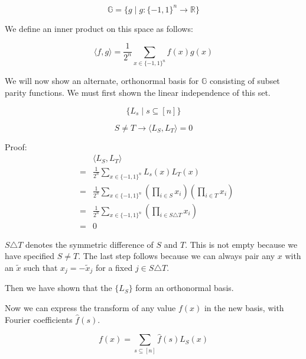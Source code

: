 \documentclass[12pt]{article}
\begin{document}
\begin{displaymath}
\mathbb{G} = \{g \mid g: \{-1,1\}^n \rightarrow \mathbb{R}\}
\end{displaymath}

We define an inner product on this space as follows:

\begin{displaymath}
\langle f,g \rangle = \frac{1}{2^n} \sum_{x \in \{-1,1\}^n} f(x)g(x)
\end{displaymath}

We will now show an alternate, orthonormal basis for $\mathbb{G}$
consisting of subset parity functions.
We must first shown
the linear independence of this set.

\begin{displaymath}
\{L_s \mid s \subseteq [n]\}
\end{displaymath}

\begin{lemma}
\begin{displaymath}
S \ne T \rightarrow \langle L_S,L_T \rangle = 0
\end{displaymath}

Proof:
\begin{eqnarray*}
& & \displaystyle \langle L_S, L_T \rangle\\
& = & \frac{1}{2^n}\sum_{x \in \{-1,1\}^n}{L_s(x)L_T(x)}\\
& = & \frac{1}{2^n}\sum_{x \in \{-1,1\}^n}{\left(\prod_{i \in S}{x_i}\right)\left(\prod_{i \in T}{x_i}\right)}\\
& = & \frac{1}{2^n}\sum_{x \in \{-1,1\}^n}{\left(\prod_{i \in S \triangle T}{x_i}\right)}\\
& = & 0
\end{eqnarray*}

$S \triangle T$ denotes the symmetric difference of $S$ and $T$. This is not
empty because we have specified $S \ne T$. The last step follows because
we can always pair any $x$ with an $\tilde{x}$ such that $x_j = -\tilde{x}_j$
for a fixed $j \in S \triangle T$.

Then we have shown that the $\{L_S\}$ form an orthonormal basis.
\end{lemma}

Now we can express the transform of any value $f(x)$ in the new basis, with
Fourier coefficients $\hat{f}(s)$.

\begin{displaymath}
f(x) = \sum_{s \subseteq [n]}{\hat{f}(s)L_S(x)}
\end{displaymath}
\end{document}
